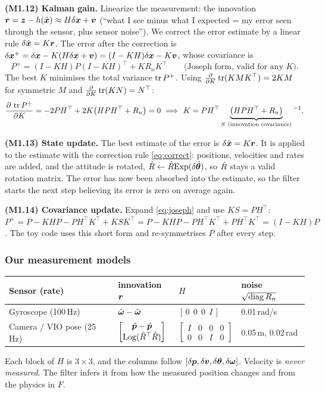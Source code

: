 \textbf{(M1.12) Kalman gain.} Linearize the measurement: the innovation $\bm{r}=\bm{z}-h(\hat{\bm x})\approx H\delta\bm{x}+\bm v$
(``what I see minus what I expected = my error seen through the sensor, plus sensor noise'').
We correct the error estimate by a linear rule $\delta\hat{\bm{x}}=K\bm{r}$. The error after the correction is
$\delta\bm{x}^+=\delta\bm{x}-K(H\delta\bm{x}+\bm v)=(I-KH)\delta\bm{x}-K\bm v$, whose covariance is
\begin{equation}
\label{eq:joseph}
  P^+=(I-KH)P(I-KH)^\top+KR_nK^\top \qquad\text{(Joseph form, valid for any $K$).}
\end{equation}
The best $K$ minimises the total variance $\operatorname{tr} P^+$. Using $\frac{\partial}{\partial K}\operatorname{tr}(KMK^\top)=2KM$ for
symmetric $M$ and $\frac{\partial}{\partial K}\operatorname{tr}(KN)=N^\top$:
\[
  \frac{\partial\,\tr P^+}{\partial K}=-2PH^\top+2K\big(HPH^\top+R_n\big)=0
  \ \Longrightarrow\ K=PH^\top\underbrace{\big(HPH^\top+R_n\big)}_{S\ \text{(innovation covariance)}}{}^{-1}.
\]

\textbf{(M1.13) State update.} The best estimate of the error is $\delta\hat{\bm{x}}=K\bm{r}$. It is applied to the
estimate with the correction rule \eqref{eq:correct}: positions, velocities and rates are added, and the attitude
is rotated, $\hat{R}\leftarrow\hat{R}\mathrm{Exp}(\delta\hat{\bm{\theta}})$, so $\hat{R}$ stays a valid rotation matrix. The error has now been
absorbed into the estimate, so the filter starts the next step believing its error is zero on average again.

\textbf{(M1.14) Covariance update.} Expand \eqref{eq:joseph} and use $KS=PH^\top$:
$P^+=P-KHP-PH^\top K^\top+KSK^\top=P-KHP-PH^\top K^\top+PH^\top K^\top=(I-KH)P$.
The toy code uses this short form and re-symmetrises $P$ after every step.

\subsubsection*{Our measurement models}

\begin{center}\small
\begin{tabular}{@{}llll@{}}
\toprule
Sensor (rate) & innovation $\bm{r}$ & $H$ & noise $\sqrt{\operatorname{diag} R_n}$\\
\midrule
Gyroscope (100\,Hz) & $\tilde{\bm{\omega}}-\hat{\bm\omega}$ & $[\,0\ \ 0\ \ 0\ \ I\,]$ & 0.01\,rad/s\\
Camera / VIO pose (25\,Hz) & $\begin{bmatrix}\tilde{\bm{p}}-\hat{\bm p}\\ \mathrm{Log}(\hat{R}^\top\tilde R)\end{bmatrix}$ &
  $\begin{bmatrix}I&0&0&0\\0&0&I&0\end{bmatrix}$ & 0.05\,m, 0.02\,rad\\
\bottomrule
\end{tabular}
\end{center}
Each block of $H$ is $3\times3$, and the columns follow $[\delta\bm{p},\delta\bm{v},\delta\bm{\theta},\delta\bm{\omega}]$. Velocity is
\emph{never measured}. The filter infers it from how the measured position changes and from the physics in $F$.


